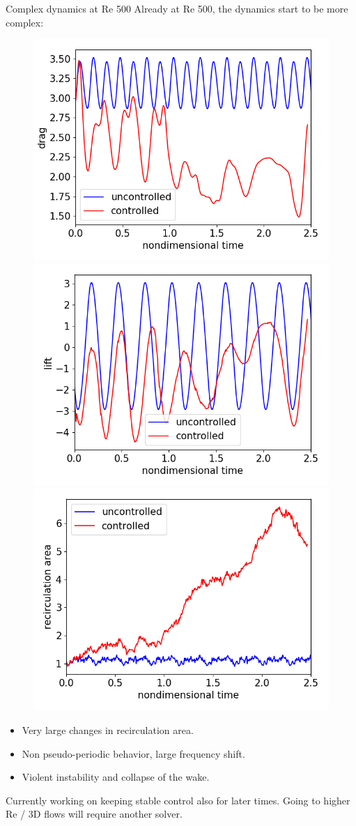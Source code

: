 \documentclass{beamer}
\begin{document}
\begin{frame}{Complex dynamics at Re 500}
    Already at Re 500, the dynamics start to be more complex:

    \begin{figure}
    \begin{center}
      \includegraphics[width=.32\textwidth]{Figures/both_drag}
      \includegraphics[width=.32\textwidth]{Figures/both_lift}
      \includegraphics[width=.32\textwidth]{Figures/both_area}
    \end{center}
    \end{figure}

    \begin{itemize}
        \item Very large changes in recirculation area.
        \item Non pseudo-periodic behavior, large frequency shift.
        \item Violent instability and collapse of the wake.
    \end{itemize}

    Currently working on keeping stable control also for later times. Going to higher Re / 3D flows will require another solver.

\end{frame}
\end{document}
